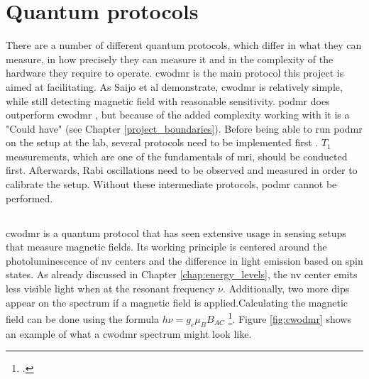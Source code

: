 \section{Quantum protocols}
There are a number of different quantum protocols, which differ in what they can measure, in how precisely they can measure it and in the complexity of the hardware they require to operate. \gls{cwodmr} is the main protocol this project is aimed at facilitating. As Saijo et al \cite{saijo2018ac} demonstrate, \gls{cwodmr} is relatively simple, while still detecting magnetic field with reasonable sensitivity. \gls{podmr} does outperform \gls{cwodmr} \cite{zhang2020high}, but because of the added complexity working with it is a "Could have" (see Chapter \ref{project_boundaries}). Before being able to run \gls{podmr} on the setup at the lab, several protocols need to be implemented first \cite{sewani2020coherent}. $T_1$ measurements, which are one of the fundamentals of \gls{mri}, should be conducted first. Afterwards, Rabi oscillations need to be observed and measured in order to calibrate the setup. Without these intermediate protocols, \gls{podmr} cannot be performed.



\subsection{}
\gls{cwodmr} is a quantum protocol that has seen extensive usage in sensing setups that measure magnetic fields. Its working principle is centered around the photoluminescence of \gls{nv} centers and the difference in light emission based on spin states. As already discussed in Chapter \ref{chap:energy_levels}, the \gls{nv} center emits less visible light when at the resonant frequency $\nu$. Additionally, two more dips appear on the spectrum if a magnetic field is applied.Calculating the magnetic field can be done using the formula $h\nu = g_e\mu_BB_{AC}$ \footcite[In the formula, $h$ is the Planck constant, $g_e$ is the g-factor of the electron and $\mu_B$ is the Bohr magneton. Knowing all other variables, $B_{AC}$ can easily be calculated.]{enwiki:1301371272}. Figure \ref{fig:cwodmr} shows an example of what a \gls{cwodmr} spectrum might look like. 

